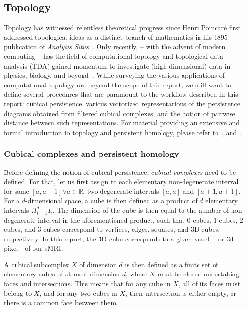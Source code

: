 \documentclass{article}
\begin{document}
\subsection{Topology}

Topology has witnessed relentless theoretical progress since Henri Poincaré first addressed
topological ideas as a distinct branch of mathematics in his 1895 publication of \textit{Analysis
Situs}~\citep{poincare1895analysis, james1999history}. Only recently, -- with the advent of modern
computing -- has the field of computational topology and topological data analysis (TDA) gained
momentum to investigate (high-dimensional) data in physics, biology, and
beyond~\citep{dey1999computational, ghrist2008barcodes, amezquita2020shape}. While surveying the
various applications of computational topology are beyond the scope of this report, we still want to
define several procedures that are paramount to the workflow described in this report: cubical
persistence, various vectorized representations of the persistence diagrams obtained from filtered
cubical complexes, and the notion of pairwise distance between such representations. For material
providing an extensive and formal introduction to topology and persistent homology, please refer
to~\citet{freedman2009algebraic, edelsbrunner2010computational}, and \citet{ghrist2008barcodes}.


\subsubsection{Cubical complexes and persistent homology}

Before defining the notion of cubical persistence, \emph{cubical complexes} need to be defined. For
that, let us first assign to each elementary non-degenerate interval for some $[a,a+1]\forall
a\in\mathbb{R}$, two degenerate intervals $[a,a]$ and $[a+1,a+1]$. For a
$d$-dimensional space, a cube is then defined as a product of $d$ elementary intervals
$\Pi_{i=1}^{d}I_i$. The dimension of the cube is then equal to the number of non-degenerate interval
in the aforementioned product, such that 0-cubes, 1-cubes, 2-cubes, and 3-cubes correspond to
vertices, edges, squares, and 3D cubes, respectively. In this report, the 3D cube corresponds to a
given voxel--- or 3d pixel---of our sMRI.

A cubical subcomplex $X$ of dimension $d$ is then defined as a finite set of elementary cubes of at
most dimension $d$, where $X$ must be closed undertaking faces and intersections. This means that
for any cube in $X$, all of its faces must belong to $X$, and for any two cubes in $X$, their
intersection is either empty, or there is a common face between them.
\end{document}
